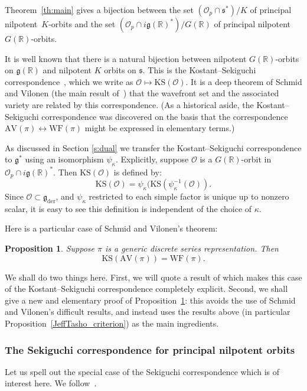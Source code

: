 \documentclass[cupthm]{CUP-JNL-JMJ}
\numberwithin{equation}{section}
\theoremstyle{cupplain}
\newtheorem{proposition}{Proposition}[section]
\theoremstyle{cupdefinition}
\theoremstyle{cupremark}
\theoremstyle{cupproof}
\renewcommand{\O}{\mathcal O}
\newcommand{\R}{\mathbb R}
\newcommand{\g}{\mathfrak g}
\newcommand{\gder}{\mathfrak g_{\mathrm{der}}}
\newcommand\inv{^{-1}}
\newcommand{\s}{\mathfrak s}
\newcommand{\AV}{\mathrm{AV}}
\newcommand{\KS}{\mathrm{KS}}
\newcommand{\WF}{\mathrm{WF}}
\newcommand{\Op}{\O_p}
\begin{document}
Theorem~\ref{th:main} gives a bijection between the set $(\Op \cap \s^*)/K$ of principal nilpotent~$K$-orbits and the set $(\Op \cap i\g(\R)^*)/G(\R)$ of principal nilpotent~$G(\R)$-orbits. 

It is well known that there is a natural bijection between nilpotent $G(\R)$-orbits on $\g(\R)$ and nilpotent $K$ orbits on $\s$. 
This is the Kostant--Sekiguchi
correspondence~\cite{sekiguchi}, which we write as $\O \mapsto \KS(\O)$. It is a deep theorem of
Schmid and Vilonen (the main result of~\cite{SV1}) that the wavefront
set and the associated variety are related by this
correspondence. (As a historical aside, the Kostant--Sekiguchi
correspondence was discovered on the basis that the correspondence
$\AV(\pi) \leftrightarrow \WF(\pi)$ might be expressed in elementary
terms.)

As discussed in Section \ref{s:dual} we transfer the Kostant--Sekiguchi correspondence to $\g^*$ using  an isomorphism $\psi_\kappa$.
Explicitly, suppose $\O$ is a $G(\R)$-orbit in $\O_p\cap i\g(\R)^*$.  Then $\KS(\O)$ is defined by:
$$
\KS(\O)=\psi_\kappa(\KS(\psi_\kappa\inv(\O)).
$$
Since $\O\subset \gder$, and $\psi_\kappa$ restricted to each simple factor is unique up to nonzero scalar, it is easy to see this definition
is independent of the choice of $\kappa$. 

Here is a particular case of Schmid and Vilonen's theorem:

\begin{proposition} \label{Sekiguchi_result}
Suppose $\pi$ is a generic discrete series representation. Then
$$
\KS(\AV(\pi))=\WF(\pi).
$$
\end{proposition}

We shall do two things here. First, we will quote a result of \cite{AVAV} which makes this case of the Kostant--Sekiguchi correspondence completely explicit. Second, we shall give a new and elementary proof of Proposition~\ref{Sekiguchi_result}: this avoids the use of Schmid and Vilonen's difficult results, and instead uses the results above (in particular Proposition~\ref{JeffTasho_criterion}) as the main ingredients. 


\subsubsection{The Sekiguchi correspondence for principal nilpotent orbits}\label{sec:concrete_sek}
Let us spell out the special case of the Sekiguchi correspondence which is of interest here. We follow~\cite[Section~2]{AVAV}.
\end{document}
